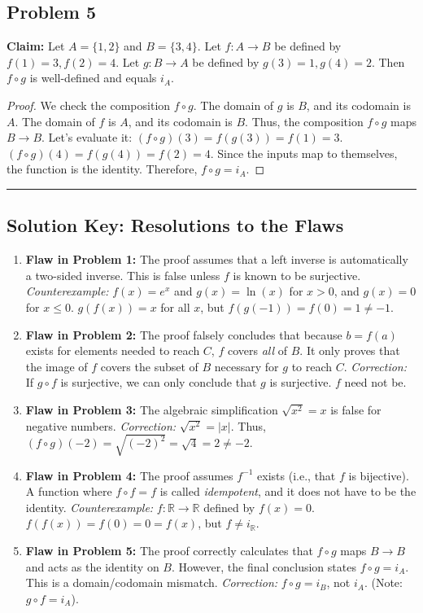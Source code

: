 \documentclass[11pt, a4paper]{article}
\theoremstyle{definition}
\theoremstyle{remark}
\newcommand{\R}{\mathbb{R}}
\begin{document}
\subsection*{Problem 5}
\textbf{Claim:} Let $A = \{1, 2\}$ and $B = \{3, 4\}$. Let $f: A \to B$ be defined by $f(1)=3, f(2)=4$. Let $g: B \to A$ be defined by $g(3)=1, g(4)=2$. Then $f \circ g$ is well-defined and equals $i_A$.
\begin{proof}
We check the composition $f \circ g$. The domain of $g$ is $B$, and its codomain is $A$. The domain of $f$ is $A$, and its codomain is $B$. Thus, the composition $f \circ g$ maps $B \to B$.
Let's evaluate it:
$(f \circ g)(3) = f(g(3)) = f(1) = 3$.
$(f \circ g)(4) = f(g(4)) = f(2) = 4$.
Since the inputs map to themselves, the function is the identity. Therefore, $f \circ g = i_A$.
\end{proof}

\vspace{2em}
\hrule
\vspace{1em}
\subsection*{Solution Key: Resolutions to the Flaws}
\begin{enumerate}
    \item \textbf{Flaw in Problem 1:} The proof assumes that a left inverse is automatically a two-sided inverse. This is false unless $f$ is known to be surjective. \textit{Counterexample:} $f(x) = e^x$ and $g(x) = \ln(x)$ for $x>0$, and $g(x)=0$ for $x \le 0$. $g(f(x)) = x$ for all $x$, but $f(g(-1)) = f(0) = 1 \neq -1$.
    \item \textbf{Flaw in Problem 2:} The proof falsely concludes that because $b = f(a)$ exists for elements needed to reach $C$, $f$ covers \textit{all} of $B$. It only proves that the image of $f$ covers the subset of $B$ necessary for $g$ to reach $C$. \textit{Correction:} If $g \circ f$ is surjective, we can only conclude that $g$ is surjective. $f$ need not be.
    \item \textbf{Flaw in Problem 3:} The algebraic simplification $\sqrt{x^2} = x$ is false for negative numbers. \textit{Correction:} $\sqrt{x^2} = |x|$. Thus, $(f \circ g)(-2) = \sqrt{(-2)^2} = \sqrt{4} = 2 \neq -2$.
    \item \textbf{Flaw in Problem 4:} The proof assumes $f^{-1}$ exists (i.e., that $f$ is bijective). A function where $f \circ f = f$ is called \textit{idempotent}, and it does not have to be the identity. \textit{Counterexample:} $f: \R \to \R$ defined by $f(x) = 0$. $f(f(x)) = f(0) = 0 = f(x)$, but $f \neq i_\R$.
    \item \textbf{Flaw in Problem 5:} The proof correctly calculates that $f \circ g$ maps $B \to B$ and acts as the identity on $B$. However, the final conclusion states $f \circ g = i_A$. This is a domain/codomain mismatch. \textit{Correction:} $f \circ g = i_B$, not $i_A$. (Note: $g \circ f = i_A$).
\end{enumerate}
\end{document}
